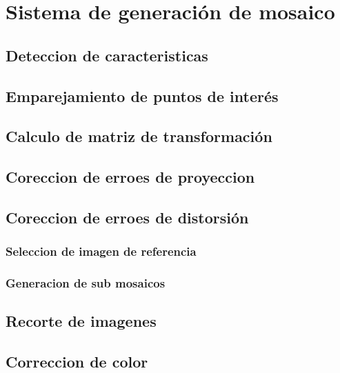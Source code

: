 \chapter{Sistema de generación de mosaico}
\label{capitulo3}

\section{Deteccion de caracteristicas}

\section{Emparejamiento de puntos de interés}

\section{Calculo de matriz de transformación}

\section{Coreccion de erroes de proyeccion}
\section{Coreccion de erroes de distorsión}
\subsection{Seleccion de imagen de referencia}
\subsection{Generacion de sub mosaicos}

\section{Recorte de imagenes}

\section{Correccion de color}


